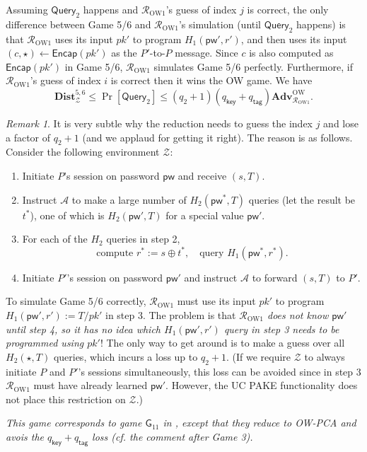 \documentclass{article}
\theoremstyle{plain}
\theoremstyle{definition}
\theoremstyle{remark}
\newtheorem{remark}{Remark}
\newcommand{\adv}{\mathcal{A}}
\newcommand{\env}{\mathcal{Z}}
\newcommand{\red}{\mathcal{R}}
\newcommand{\Adv}{\mathbf{Adv}}
\newcommand{\Dist}{\mathbf{Dist}}
\newcommand{\Encap}{\mathsf{Encap}}
\newcommand{\pw}{\mathsf{pw}}
\newcommand{\qkey}{q_\mathsf{key}}
\newcommand{\qtag}{q_\mathsf{tag}}
\newcommand{\Query}{\mathsf{Query}}
\begin{document}
Assuming $\Query_2$ happens and $\red_\text{OW1}$'s guess of index $j$ is correct, the only difference between Game 5/6 and $\red_\text{OW1}$'s simulation (until $\Query_2$ happens) is that $\red_\text{OW1}$ uses its input $pk'$ to program $H_1(\pw',r')$, and then uses its input $(c,\star) \gets \Encap(pk')$ as the $P'$-to-$P$ message. Since $c$ is also computed as $\Encap(pk')$ in Game 5/6, $\red_\text{OW1}$ simulates Game 5/6 perfectly. Furthermore, if $\red_\text{OW1}$'s guess of index $i$ is correct then it wins the OW game. We have
\[
\Dist_\env^{5,6} \leq \Pr[\Query_2] \leq (q_2+1)(\qkey+\qtag)\Adv_{\red_\text{OW1}}^\text{OW}.
\]

\begin{remark}
It is very subtle why the reduction needs to guess the index $j$ and lose a factor of $q_2+1$ (and we applaud \cite{EPRINT:ArrBarJar25} for getting it right). The reason is as follows. Consider the following environment $\env$:
\begin{enumerate}
  \item Initiate $P$'s session on password $\pw$ and receive $(s,T)$.
  \item Instruct $\adv$ to make a large number of $H_2(\pw^*,T)$ queries (let the result be $t^*$), one of which is $H_2(\pw',T)$ for a special value $\pw'$.
  \item For each of the $H_2$ queries in step 2,
      \[
      \text{compute }r^* := s \oplus t^*, \quad \text{query }H_1(\pw^*,r^*).
      \]
  \item Initiate $P'$'s session on password $\pw'$ and instruct $\adv$ to forward $(s,T)$ to $P'$.
\end{enumerate}
To simulate Game 5/6 correctly, $\red_\text{OW1}$ must use its input $pk'$ to program $H_1(\pw',r') := T/pk'$ in step 3. The problem is that \emph{$\red_\mathrm{OW1}$ does not know $\pw'$ until step 4, so it has no idea which $H_1(\pw',r')$ query in step 3 needs to be programmed using $pk'$}! The only way to get around is to make a guess over all $H_2(\star,T)$ queries, which incurs a loss up to $q_2+1$. (If we require $\env$ to always initiate $P$ and $P'$'s sessions simultaneously, this loss can be avoided since in step 3 $\red_\mathrm{OW1}$ must have already learned $\pw'$. However, the UC PAKE functionality does not place this restriction on $\env$.)
\end{remark}

\medskip\emph{{\color{red}This game corresponds to game $\mathsf{G}_{11}$ in \cite{EPRINT:ArrBarJar25}, except that they reduce to OW-PCA and avois the $\qkey+\qtag$ loss (cf. the comment after Game 3).}}
\end{document}
